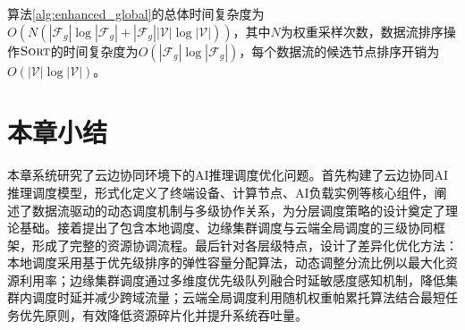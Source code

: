 算法\ref{alg:enhanced_global}的总体时间复杂度为$O(N(|\mathcal{F}_g|\log|\mathcal{F}_g| + |\mathcal{F}_g||\mathcal{V}|\log|\mathcal{V}|))$，其中$N$为权重采样次数，数据流排序操作$\textsc{Sort}$的时间复杂度为$O(|\mathcal{F}_g|\log|\mathcal{F}_g|)$，每个数据流的候选节点排序开销为$O(|\mathcal{V}|\log|\mathcal{V}|)$。

\section{本章小结}

本章系统研究了云边协同环境下的AI推理调度优化问题。首先构建了云边协同AI推理调度模型，形式化定义了终端设备、计算节点、AI负载实例等核心组件，阐述了数据流驱动的动态调度机制与多级协作关系，为分层调度策略的设计奠定了理论基础。接着提出了包含本地调度、边缘集群调度与云端全局调度的三级协同框架，形成了完整的资源协调流程。最后针对各层级特点，设计了差异化优化方法：本地调度采用基于优先级排序的弹性容量分配算法，动态调整分流比例以最大化资源利用率；边缘集群调度通过多维度优先级队列融合时延敏感度感知机制，降低集群内调度时延并减少跨域流量；云端全局调度利用随机权重帕累托算法结合最短任务优先原则，有效降低资源碎片化并提升系统吞吐量。
